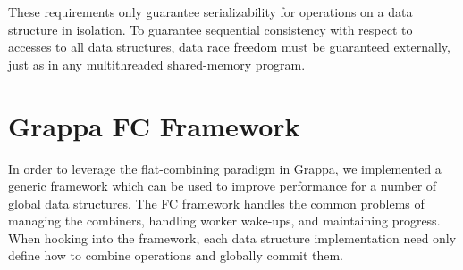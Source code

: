 


These requirements only guarantee serializability for operations on a data structure in isolation. To guarantee sequential consistency with respect to accesses to all data structures, data race freedom  must be guaranteed externally, just as in any multithreaded shared-memory program.

\section{Grappa FC Framework}
In order to leverage the flat-combining paradigm in Grappa, we implemented a generic framework which can be used to improve performance for a number of global data structures. The FC framework handles the common problems of managing the combiners, handling worker wake-ups, and maintaining progress. When hooking into the framework, each data structure implementation need only define how to combine operations and globally commit them.

